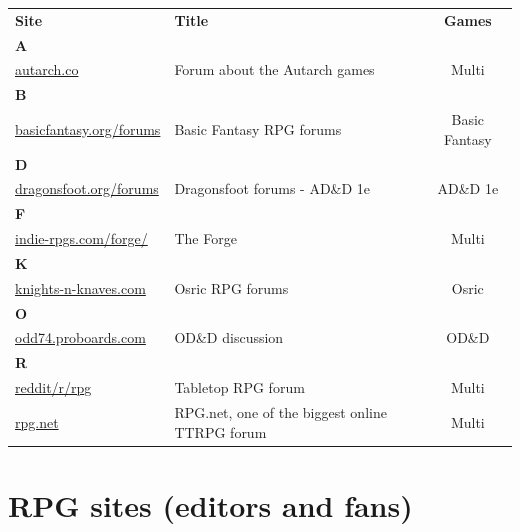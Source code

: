 \documentclass[a4paper, 11pt, twoside]{article}
\begin{document}
\begin{longtable}{llc}
\textbf{Site} & \textbf{Title} & \textbf{Games}\\
\textbf{A} &  & \\
\href{https://forum.autarch.co/}{autarch.co} & Forum about the Autarch games & Multi\\
\textbf{B} &  & \\
\href{https://www.basicfantasy.org/forums}{basicfantasy.org/forums} & Basic Fantasy RPG forums & Basic Fantasy\\
\textbf{D} &  & \\
\href{https://www.dragonsfoot.org/forums}{dragonsfoot.org/forums} & Dragonsfoot forums - AD\&D 1e & AD\&D 1e\\
\textbf{F} &  & \\
\href{http://www.indie-rpgs.com/forge/index.php}{indie-rpgs.com/forge/} & The Forge & Multi\\
\textbf{K} &  & \\
\href{https://www.knights-n-knaves.com/phpbb3/}{knights-n-knaves.com} & Osric RPG forums & Osric\\
\textbf{O} &  & \\
\href{https://odd74.proboards.com}{odd74.proboards.com} & OD\&D discussion & OD\&D\\
\textbf{R} &  & \\
\href{https://www.reddit.com/r/rpg/}{reddit/r/rpg} & Tabletop RPG forum & Multi\\
\href{https://www.rpg.net}{rpg.net} & RPG.net, one of the biggest online TTRPG forum & Multi\\
\end{longtable}

\section{RPG sites (editors and fans)}
\label{sec:org673c923}
\end{document}
